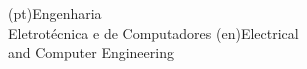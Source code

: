 




\ntdepartment(pt){Engenharia\\Eletrotécnica e de Computadores}
\ntdepartment(en){Electrical\\and Computer Engineering}







%


